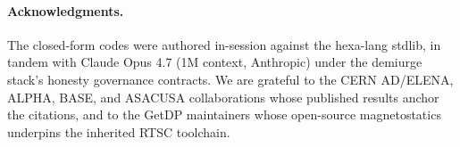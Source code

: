 \documentclass[11pt,a4paper]{article}
\begin{document}
\paragraph{Acknowledgments.} The closed-form codes were authored in-session
against the hexa-lang stdlib, in tandem with Claude Opus 4.7 (1M context,
Anthropic) under the demiurge stack's honesty governance contracts. We are
grateful to the CERN AD/ELENA, ALPHA, BASE, and ASACUSA collaborations whose
published results anchor the citations, and to the GetDP maintainers whose
open-source magnetostatics underpins the inherited RTSC toolchain.




\clearpage
\appendix













\end{document}
